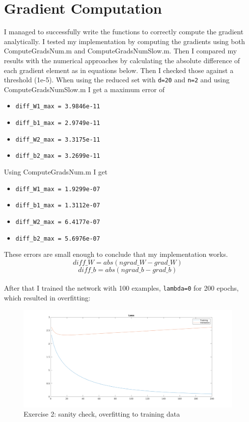\section{Gradient Computation}
I managed to successfully write the functions to correctly compute the gradient analytically.
I tested my implementation by computing the gradients using both ComputeGradsNum.m and ComputeGradsNumSlow.m.
Then I compared my results with the numerical approaches by calculating the absolute difference of each gradient element as in equations below.
Then I checked those against a threshold (1e-5). 
When using the reduced set with \texttt{d=20} and \texttt{n=2} and using ComputeGradsNumSlow.m 
I get a maximum error of 
\begin{itemize}
    \item \texttt{diff\_W1\_max = 3.9846e-11}
    \item \texttt{diff\_b1\_max = 2.9749e-11}
    \item \texttt{diff\_W2\_max = 3.3175e-11}
    \item \texttt{diff\_b2\_max = 3.2699e-11}
\end{itemize}
Using ComputeGradsNum.m I get 
\begin{itemize}
    \item \texttt{diff\_W1\_max = 1.9299e-07}
    \item \texttt{diff\_b1\_max = 1.3112e-07}
    \item \texttt{diff\_W2\_max = 6.4177e-07}
    \item \texttt{diff\_b2\_max = 5.6976e-07}
\end{itemize}
These errors are small enough to conclude that my implementation works. \\ 
\begin{equation}\label{eq:diffw}
    diff\_W = abs(ngrad\_W - grad\_W)
\end{equation}
\begin{equation}\label{eq:diffb}
    diff\_b = abs(ngrad\_b - grad\_b)
\end{equation}
\\
After that I trained the network with 100 examples, \texttt{lambda=0} for 200 epochs, which resulted in overfitting:
    \begin{figure}[ht]
        \includegraphics[width=\textwidth]{../code/result_pics/loss_sanity_overfitting.png}
        \caption{Exercise 2: sanity check, overfitting to training data}
    \end{figure}


